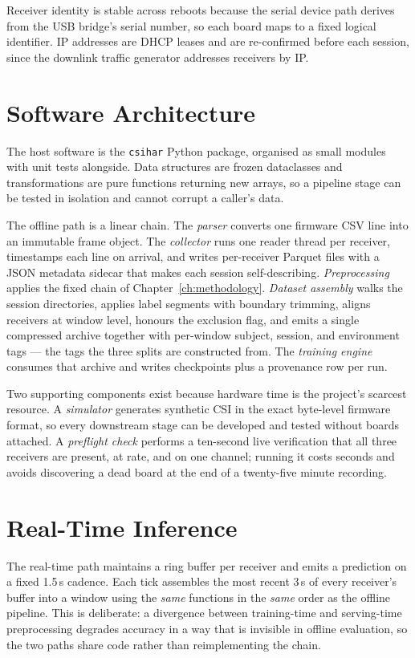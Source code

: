 Receiver identity is stable across reboots because the serial device path
derives from the USB bridge's serial number, so each board maps to a fixed
logical identifier. IP addresses are DHCP leases and are re-confirmed before
each session, since the downlink traffic generator addresses receivers by IP.

\section{Software Architecture}

The host software is the \texttt{csihar} Python package, organised as small
modules with unit tests alongside. Data structures are frozen dataclasses and
transformations are pure functions returning new arrays, so a pipeline stage
can be tested in isolation and cannot corrupt a caller's data.

The offline path is a linear chain. The \emph{parser} converts one firmware
CSV line into an immutable frame object. The \emph{collector} runs one reader
thread per receiver, timestamps each line on arrival, and writes per-receiver
Parquet files with a JSON metadata sidecar that makes each session
self-describing. \emph{Preprocessing} applies the fixed chain of
Chapter~\ref{ch:methodology}. \emph{Dataset assembly} walks the session
directories, applies label segments with boundary trimming, aligns receivers
at window level, honours the exclusion flag, and emits a single compressed
archive together with per-window subject, session, and environment tags ---
the tags the three splits are constructed from. The \emph{training engine}
consumes that archive and writes checkpoints plus a provenance row per run.

Two supporting components exist because hardware time is the project's
scarcest resource. A \emph{simulator} generates synthetic CSI in the exact
byte-level firmware format, so every downstream stage can be developed and
tested without boards attached. A \emph{preflight check} performs a ten-second
live verification that all three receivers are present, at rate, and on one
channel; running it costs seconds and avoids discovering a dead board at the
end of a twenty-five minute recording.

\section{Real-Time Inference}

The real-time path maintains a ring buffer per receiver and emits a
prediction on a fixed 1.5\,s cadence. Each tick assembles the most recent
3\,s of every receiver's buffer into a window using the \emph{same} functions
in the \emph{same} order as the offline pipeline. This is deliberate: a
divergence between training-time and serving-time preprocessing degrades
accuracy in a way that is invisible in offline evaluation, so the two paths
share code rather than reimplementing the chain.

